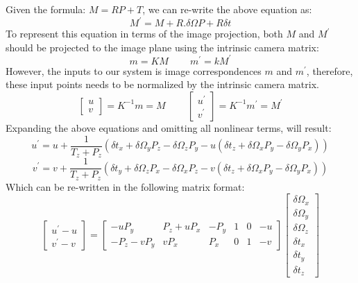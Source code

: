 \documentclass{article}
\begin{document}
Given the formula: $M=RP+T$, we can re-write the above equation as:
\begin{equation}
M^{'} = M + R. \delta\Omega P + R \delta t
\end{equation}
To represent this equation in terms of the image projection, both $M$ and $M^{'}$ should be projected to the image plane using the intrinsic camera matrix:
\begin{equation}
m = KM \;\;\;\;\;\;\;\; m^{'} = k M^{'}
\end{equation}
However, the inputs to our system is image correspondences $m$ and $m^{'}$, therefore, these input points needs to be normalized by the intrinsic camera matrix.
\begin{equation}
\begin{bmatrix}u \\ v \end{bmatrix} = K^{-1}m = M 
\;\;\;\;\;\;\;\; 
\begin{bmatrix}u^{'} \\ v^{'} \end{bmatrix} = K^{-1}m^{'} = M^{'}
\end{equation}
Expanding the above equations and omitting all nonlinear terms, will result:
\begin{equation}
u^{'} = u + \frac{1}{T_z + P_z} (\delta t_x + \delta \Omega_y P_z - \delta \Omega_z P_y - u(\delta t_z+\delta \Omega_x P_y -\delta \Omega_y P_x))
\end{equation}
\begin{equation}
v^{'} = v + \frac{1}{T_z + P_z} (\delta t_y + \delta \Omega_z P_x - \delta \Omega_x P_z -v(\delta t_z+\delta \Omega_x P_y -\delta \Omega_y P_x) )
\end{equation}
Which can be re-written in the following matrix format:
\begin{equation}
\begin{bmatrix}
u^{'} - u \\ v^{'}-v
\end{bmatrix} = \begin{bmatrix}
-u P_y & P_z + u P_x & -P_y & 1 & 0 & -u \\
-P_z - v P_y & v P_x & P_x & 0 & 1 & -v
\end{bmatrix} \begin{bmatrix}
\delta \Omega_x \\
\delta \Omega_y \\
\delta \Omega_z \\
\delta t_x \\
\delta t_y \\
\delta t_z 
\end{bmatrix}
\end{equation}
\end{document}
